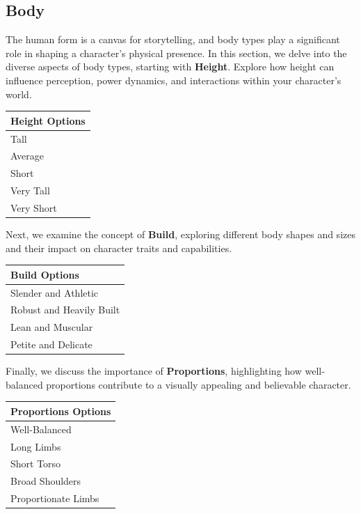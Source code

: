 \hypertarget{body}{%
\subsection{Body}\label{body}}

The human form is a canvas for storytelling, and body types play a
significant role in shaping a character's physical presence. In this
section, we delve into the diverse aspects of body types, starting with
\textbf{Height}. Explore how height can influence perception, power
dynamics, and interactions within your character's world.

\begin{longtable}[]{@{}l@{}}
\toprule
Height Options \\
\midrule
\endhead
Tall \\
Average \\
Short \\
Very Tall \\
Very Short \\
\bottomrule
\end{longtable}

Next, we examine the concept of \textbf{Build}, exploring different body
shapes and sizes and their impact on character traits and capabilities.

\begin{longtable}[]{@{}l@{}}
\toprule
Build Options \\
\midrule
\endhead
Slender and Athletic \\
Robust and Heavily Built \\
Lean and Muscular \\
Petite and Delicate \\
\bottomrule
\end{longtable}

Finally, we discuss the importance of \textbf{Proportions}, highlighting
how well-balanced proportions contribute to a visually appealing and
believable character.

\begin{longtable}[]{@{}l@{}}
\toprule
Proportions Options \\
\midrule
\endhead
Well-Balanced \\
Long Limbs \\
Short Torso \\
Broad Shoulders \\
Proportionate Limbs \\
\bottomrule
\end{longtable}

